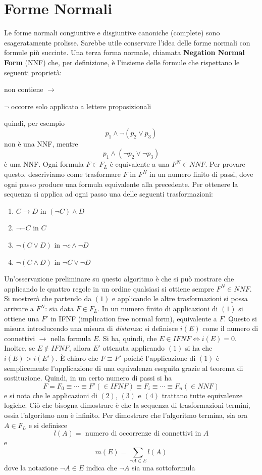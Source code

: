 \section{Forme Normali}
Le forme normali congiuntive e disgiuntive canoniche (complete) sono 
esageratamente prolisse. Sarebbe utile conservare l'idea delle forme normali 
con formule più succinte. Una terza forma normale, chiamata \textbf{Negation 
Normal Form} (NNF) che, per definizione, è l'insieme delle formule 
che rispettano le seguenti proprietà: 
\begin{description}
  \item non contiene $\rightarrow$ 
  \item $\neg$ occorre solo applicato a lettere proposizionali
\end{description}
quindi, per esempio 
$$ 
p_1 \land \neg(p_2 \lor p_3)
$$
non è una NNF, mentre 
$$
p_1 \land (\neg p_2 \lor \neg p_3)
$$
è una NNF. Ogni formula $F \in F_L$ è equivalente a una $F^{N} \in NNF$. 
Per provare questo, descriviamo come trasformare $F$ in $F^{N}$ in un numero 
finito di passi, dove ogni passo produce una formula equivalente alla precedente. 
Per ottenere la sequenza si applica ad ogni passo una delle seguenti 
trasformazioni: 
\begin{enumerate}
  \item $C \rightarrow D$ in $(\neg C) \land D$
  \item $\neg \neg C$ in $C$
  \item $\neg(C \lor D)$ in $\neg c \land \neg D$
  \item $\neg (C \land D)$ in $\neg C \lor \neg D$
\end{enumerate}
Un'osservazione preliminare su questo algoritmo è che si può mostrare che applicando 
le quattro regole in un ordine qualsiasi si ottiene sempre $F^{N} \in NNF$. 
Si mostrerà che partendo da $(1)$ e applicando le altre trasformazioni si possa 
arrivare a $F^{N}$: sia data $F \in F_L$. In un numero finito di applicazioni 
di $(1)$ si ottiene una $F'$ in IFNF (implication free normal form), equivalente 
a $F$. Questo si misura introducendo una misura di \textit{distanza}: si definisce 
$i(E)$ come il numero di connettivi $\rightarrow$ nella formula $E$. Si ha, quindi, 
che $E \in IFNF \iff i(E) = 0$. Inoltre, se $E \notin IFNF$, allora 
$E'$ ottenuta applicando $(1)$ si ha che $i(E) > i(E')$. 
\`E chiaro che $F \equiv F'$ poiché l'applicazione di $(1)$ è semplicemente 
l'applicazione di una equivalenza eseguita grazie al teorema di sostituzione. 
Quindi, in un certo numero di passi  si ha
$$ 
F = F_0 \equiv \cdots \equiv F' (\in IFNF) \equiv F_i \equiv \cdots \equiv F_n (\in NNF)
$$
e si nota che le applicazioni di $(2)$, $(3)$ e $(4)$ trattano tutte equivalenze logiche. Ciò 
che bisogna dimostrare è che la sequenza di trasformazioni termini, ossia l'algoritmo 
non è infinito. Per dimostrare che l'algoritmo termina, sia ora $A \in F_L$ 
e si definisce 
$$ 
l(A) = \text{ numero di occorrenze di connettivi in } A
$$ 
e 
$$
m(E) = \sum_{\neg A \in E} l(A)
$$
dove la notazione $\neg A \in E$ indica che $\neg A$ sia una sottoformula 

